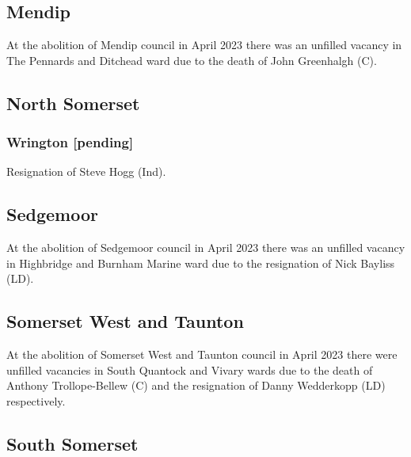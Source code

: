 \documentclass[a4paper,openany]{book}
\begin{document}
\begin{resultsiii}
\subsection*{Mendip}

At the abolition of Mendip council in April 2023 there was an unfilled vacancy in The Pennards and Ditchead ward due to the death of John Greenhalgh (C).%

\subsection*{North Somerset}

\subsubsection*{Wrington \hspace*{\fill}\nolinebreak[1]%
	\enspace\hspace*{\fill}
	[pending]}


Resignation of Steve Hogg (Ind).

\subsection*{Sedgemoor}

At the abolition of Sedgemoor council in April 2023 there was an unfilled vacancy in Highbridge and Burnham Marine ward due to the resignation of Nick Bayliss (LD).%

\subsection*{Somerset West and Taunton}

At the abolition of Somerset West and Taunton council in April 2023 there were unfilled vacancies in South Quantock and Vivary wards due to the death of Anthony Trollope-Bellew (C) and the resignation of Danny Wedderkopp (LD) respectively.%
%

\subsection*{South Somerset}


\end{resultsiii}
\end{document}
